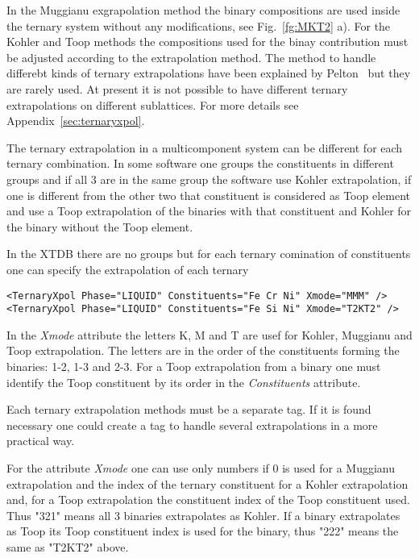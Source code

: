 \documentclass{article}
\begin{document}
\begin{appendices}
In the Muggianu exgrapolation method the binary compositions are used
inside the ternary system without any modifications, see
Fig.~\ref{fg:MKT2} a).  For the Kohler and Toop methods the
compositions used for the binay contribution must be adjusted
according to the extrapolation method.  The method to handle differebt
kinds of ternary extrapolations have been explained by
Pelton~\cite{01Pel} but they are rarely used.  At present it is not
possible to have different ternary extrapolations on different
sublattices.  For more details see Appendix~\ref{sec:ternaryxpol}.

The ternary extrapolation in a multicomponent system can be different
for each ternary combination.  In some software one groups the
constituents in different groups and if all 3 are in the same group
the software use Kohler extrapolation, if one is different from the
other two that constituent is considered as Toop element and use a
Toop extrapolation of the binaries with that constituent and Kohler
for the binary without the Toop element.

In the XTDB there are no groups but for each ternary comination of
constituents one can specify the extrapolation of each ternary

\begin{verbatim}
<TernaryXpol Phase="LIQUID" Constituents="Fe Cr Ni" Xmode="MMM" />
<TernaryXpol Phase="LIQUID" Constituents="Fe Si Ni" Xmode="T2KT2" />
\end{verbatim}

In the {\em Xmode} attribute the letters K, M and T are usef for
Kohler, Muggianu and Toop extrapolation.  The letters are in the order
of the constituents forming the binaries: 1-2, 1-3 and 2-3.  For a
Toop extrapolation from a binary one must identify the Toop
constituent by its order in the {\em Constituents} attribute.

Each ternary extrapolation methods must be a separate tag.  If it is
found necessary one could create a tag to handle several
extrapolations in a more practical way.

For the attribute {\em Xmode} one can use only numbers if 0 is used
for a Muggianu extrapolation and the index of the ternary constituent
for a Kohler extrapolation and, for a Toop extrapolation the
constituent index of the Toop constituent used.  Thus "321" means all
3 binaries extrapolates as Kohler.  If a binary extrapolates as Toop
its Toop constituent index is used for the binary, thus "222" means
the same as "T2KT2" above.


\end{appendices}
\end{document}
